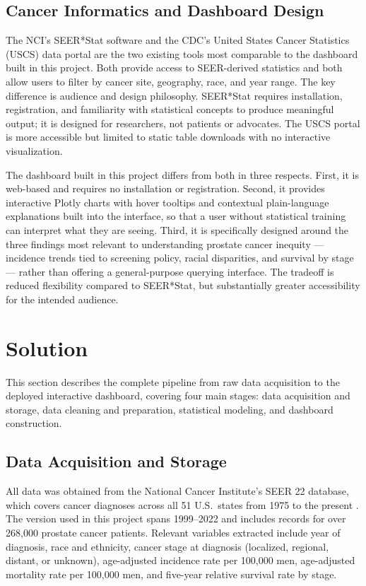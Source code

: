 \subsection{Cancer Informatics and Dashboard Design}

The NCI's SEER*Stat software and the CDC's United States Cancer Statistics (USCS)
data portal are the two existing tools most comparable to the dashboard built in this
project. Both provide access to SEER-derived statistics and both allow users to
filter by cancer site, geography, race, and year range. The key difference is
audience and design philosophy. SEER*Stat requires installation, registration, and
familiarity with statistical concepts to produce meaningful output; it is designed
for researchers, not patients or advocates. The USCS portal is more accessible but
limited to static table downloads with no interactive visualization.

The dashboard built in this project differs from both in three respects. First, it
is web-based and requires no installation or registration. Second, it provides
interactive Plotly charts with hover tooltips and contextual plain-language
explanations built into the interface, so that a user without statistical training
can interpret what they are seeing. Third, it is specifically designed around the
three findings most relevant to understanding prostate cancer inequity --- incidence
trends tied to screening policy, racial disparities, and survival by stage --- rather
than offering a general-purpose querying interface. The tradeoff is reduced
flexibility compared to SEER*Stat, but substantially greater accessibility for the
intended audience.

\section{Solution}

This section describes the complete pipeline from raw data acquisition to the
deployed interactive dashboard, covering four main stages: data acquisition and
storage, data cleaning and preparation, statistical modeling, and dashboard
construction.

\subsection{Data Acquisition and Storage}

All data was obtained from the National Cancer Institute's SEER 22 database, which
covers cancer diagnoses across all 51 U.S.\ states from 1975 to the present
\cite{seer2024}. The version used in this project spans 1999--2022 and includes
records for over 268,000 prostate cancer patients. Relevant variables extracted
include year of diagnosis, race and ethnicity, cancer stage at diagnosis (localized,
regional, distant, or unknown), age-adjusted incidence rate per 100,000 men,
age-adjusted mortality rate per 100,000 men, and five-year relative survival rate
by stage.

